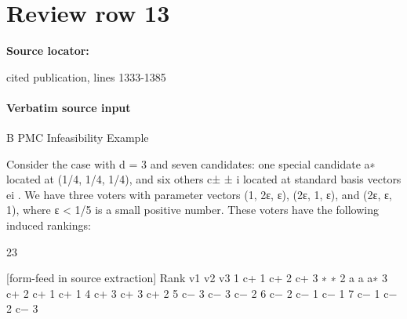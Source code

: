 \documentclass[10pt]{article}
\begin{document}
\section*{Review row 13}
\textbf{Source locator:} {\footnotesize\raggedright cited publication, lines 1333-\allowbreak{}1385\par}
\paragraph{Verbatim source input}
\begin{ReviewVerbatim}
B    PMC Infeasibility Example

Consider the case with d = 3 and seven candidates: one special candidate a∗ located at
(1/4, 1/4, 1/4), and six others c±                                    ±
                                 i located at standard basis vectors ei . We have three voters with
parameter vectors (1, 2ε, ε), (2ε, 1, ε), and (2ε, ε, 1), where ε < 1/5 is a small positive number.
These voters have the following induced rankings:


                                                        23

[form-feed in source extraction]
                                          Rank          v1       v2   v3
                                              1         c+
                                                         1       c+
                                                                  2   c+
                                                                       3
                                                         ∗        ∗
                                              2         a        a    a∗
                                              3         c+
                                                         2       c+
                                                                  1   c+
                                                                       1
                                              4         c+
                                                         3       c+
                                                                  3   c+
                                                                       2
                                              5         c−
                                                         3       c−
                                                                  3   c−
                                                                       2
                                              6         c−
                                                         2       c−
                                                                  1   c−
                                                                       1
                                              7         c−
                                                         1       c−
                                                                  2   c−
                                                                       3


\end{ReviewVerbatim}
\end{document}

